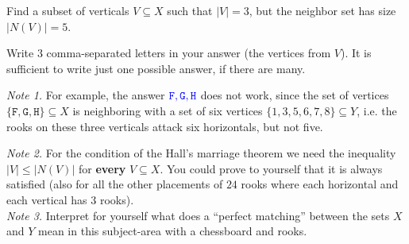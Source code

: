 \documentclass[jou]{apa6}
\begin{document}
Find a subset of verticals $V \subseteq X$ such that $|V|=3$, but
the neighbor set has size $|N(V)| = 5$.

Write $3$ comma-separated letters in your answer (the vertices from $V$). It is 
sufficient to write just one possible answer, if there are many.

\vspace{10pt}
{\em Note 1.} For example, the answer $\textcolor{blue}{\mathtt{F,G,H}}$ does not work, 
since the set of vertices $\{ \mathtt{F},\mathtt{G},\mathtt{H} \} \subseteq X$ 
is neighboring with a set of six vertices
$\{ 1,3,5,6,7,8 \} \subseteq Y$, i.e. the rooks on these three verticals
attack six horizontals, but not five.

{\em Note 2.} For the condition of the Hall's marriage theorem we need the inequality $|V| \leq |N(V)|$ 
for {\bf every} $V \subseteq X$. You could prove to yourself that it is always satisfied
(also for all the other placements of $24$ rooks where each horizontal and each 
vertical has $3$ rooks).\\
{\em Note 3.} Interpret for yourself what does a ``perfect matching'' between the sets
$X$ and $Y$ mean in this subject-area with a chessboard and rooks.
\end{document}
